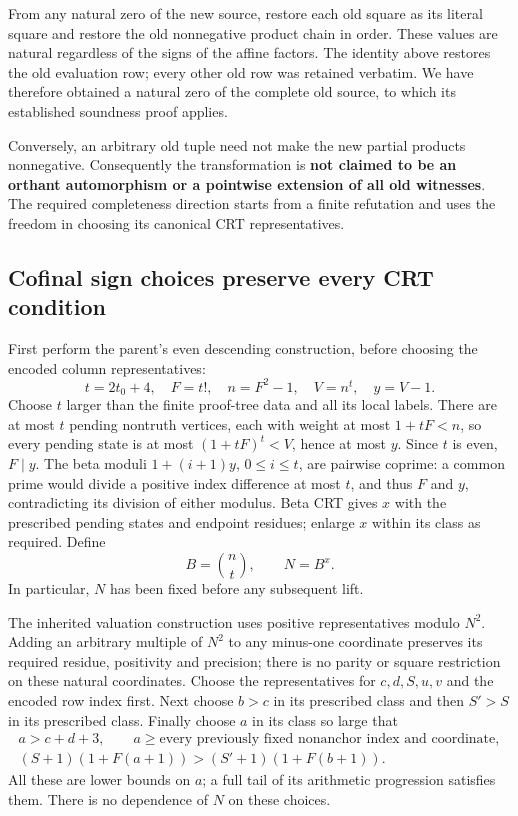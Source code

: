 From any natural zero of the new source, restore each old square as its
literal square and restore the old nonnegative product chain in order.
These values are natural regardless of the signs of the affine factors.
The identity above restores the old evaluation row; every other old row
was retained verbatim. We have therefore obtained a natural zero of the
complete old source, to which its established soundness proof applies.

Conversely, an arbitrary old tuple need not make the new partial products
nonnegative. Consequently the transformation is \textbf{not claimed to be
an orthant automorphism or a pointwise extension of all old witnesses}.
The required completeness direction starts from a finite refutation and
uses the freedom in choosing its canonical CRT representatives.

\subsection{Cofinal sign choices preserve every CRT condition}

First perform the parent's even descending construction, before choosing
the encoded column representatives:
\[
 t=2t_0+4,\quad F=t!,\quad n=F^2-1,\quad V=n^t,\quad y=V-1.
\]
Choose \(t\) larger than the finite proof-tree data and all its local labels.
There are at most \(t\) pending nontruth vertices, each with weight at most
\(1+tF<n\), so every pending state is at most \((1+tF)^t<V\), hence at
most \(y\). Since \(t\) is even, \(F\mid y\). The beta moduli
\(1+(i+1)y\), \(0\le i\le t\), are pairwise coprime: a common prime
would divide a positive index difference at most \(t\), and thus \(F\)
and \(y\), contradicting its division of either modulus. Beta CRT gives
\(x\) with the prescribed pending states and endpoint residues; enlarge
\(x\) within its class as required. Define
\[
 B=\binom nt,\qquad N=B^x.
\]
In particular, \(N\) has been fixed before any subsequent lift.

The inherited valuation construction uses positive representatives modulo
\(N^2\). Adding an arbitrary multiple of \(N^2\) to any minus-one
coordinate preserves its required residue, positivity and precision; there
is no parity or square restriction on these natural coordinates.
Choose the representatives for \(c,d,S,u,v\) and the encoded row index
first. Next choose \(b>c\) in its prescribed class and then \(S'>S\)
in its prescribed class. Finally choose \(a\) in its class so large that
\begin{gather*}
 a>c+d+3,\qquad
 a\ge\text{every previously fixed nonanchor index and coordinate},\\
 (S+1)(1+F(a+1))>(S'+1)(1+F(b+1)).
 \tag{C3}
\end{gather*}
All these are lower bounds on \(a\); a full tail of its arithmetic
progression satisfies them. There is no dependence of \(N\) on these choices.

